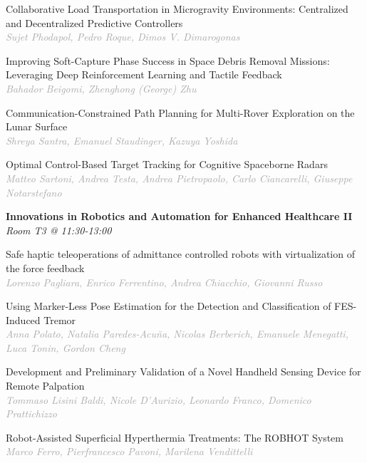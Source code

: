 \begin{multicols*}{2}
\small Collaborative Load Transportation in Microgravity Environments: Centralized and Decentralized Predictive Controllers\\ 
\footnotesize \textcolor{darkgray}{\textit{Sujet Phodapol, Pedro  Roque, Dimos V.  Dimarogonas}}

\small Improving Soft-Capture Phase Success in Space Debris Removal Missions: Leveraging Deep Reinforcement Learning and Tactile Feedback\\ 
\footnotesize \textcolor{darkgray}{\textit{Bahador Beigomi, Zhenghong (George)  Zhu}}

\small Communication-Constrained Path Planning for Multi-Rover Exploration on the Lunar Surface\\ 
\footnotesize \textcolor{darkgray}{\textit{Shreya Santra, Emanuel  Staudinger, Kazuya  Yoshida}}

\small Optimal Control-Based Target Tracking for Cognitive Spaceborne Radars\\ 
\footnotesize \textcolor{darkgray}{\textit{Matteo Sartoni, Andrea  Testa, Andrea  Pietropaolo, Carlo  Ciancarelli, Giuseppe  Notarstefano}}

\normalsize \textbf{Innovations in Robotics and Automation for Enhanced Healthcare II}\\
\small \textit{Room T3 @ 11:30-13:00}

\small Safe haptic teleoperations of admittance controlled robots with virtualization of the force feedback\\ 
\footnotesize \textcolor{darkgray}{\textit{Lorenzo Pagliara, Enrico  Ferrentino, Andrea  Chiacchio, Giovanni  Russo}}

\small Using Marker-Less Pose Estimation for the Detection and Classification of FES-Induced Tremor\\ 
\footnotesize \textcolor{darkgray}{\textit{Anna Polato, Natalia  Paredes-Acuña, Nicolas  Berberich, Emanuele  Menegatti, Luca  Tonin, Gordon  Cheng}}

\small Development and Preliminary Validation of a Novel Handheld Sensing Device for Remote Palpation\\ 
\footnotesize \textcolor{darkgray}{\textit{Tommaso Lisini Baldi, Nicole  D'Aurizio, Leonardo  Franco, Domenico  Prattichizzo}}

\small Robot-Assisted Superficial Hyperthermia Treatments: The ROBHOT System\\ 
\footnotesize \textcolor{darkgray}{\textit{Marco Ferro, Pierfrancesco  Pavoni, Marilena  Vendittelli}}


\end{multicols*}
